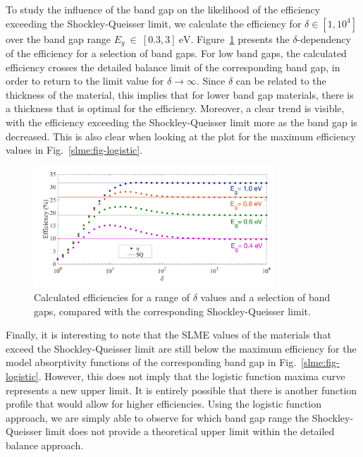 \begin{refsection}
To study the influence of the band gap on the likelihood of the efficiency 
exceeding the Shockley-Queisser limit, we calculate the efficiency for $\delta 
\in [1, 10^4]$ over the band gap range $E_g~\in~[0.3, 3]~\si{\electronvolt}$. 
Figure~\ref{slme:fig-deltadep} presents the $\delta$-dependency of the efficiency for a selection of band gaps. For low band gaps, the 
calculated efficiency crosses the detailed balance limit of the corresponding 
band gap, in order to return to the limit value for $\delta \rightarrow 
\infty$. Since $\delta$ can be related to the thickness of the material, this 
implies that for lower band gap materials, there is a thickness that is 
optimal for the efficiency. Moreover, a clear trend is visible, with the 
efficiency exceeding the Shockley-Queisser limit more as the band gap is 
decreased. This is also clear when looking at the plot for the 
maximum efficiency values in Fig.~\ref{slme:fig-logistic}. 
 
\begin{figure}[ht] 
\centering 
\captionsetup{width=0.9\textwidth}
\includegraphics[width=0.8\textwidth]{Figures/slme/sq_Fig3.png} 
\caption{Calculated efficiencies for a range of $\delta$ values and a 
selection of band gaps, compared with the corresponding Shockley-Queisser 
limit.} 
\label{slme:fig-deltadep} 
\end{figure} 
 
Finally, it is interesting to note that the \gls{SLME} values of the materials that 
exceed the Shockley-Queisser limit are still below the maximum efficiency for 
the model absorptivity functions of the corresponding band gap in 
Fig.~\ref{slme:fig-logistic}. However, this does not imply that the logistic 
function maxima curve represents a new upper limit. It is entirely possible 
that there is another function profile that would allow for higher 
efficiencies. Using the logistic function approach, we are simply able to 
observe for which band gap range the Shockley-Queisser limit does not provide 
a theoretical upper limit within the detailed balance approach. 
 

\end{refsection}
